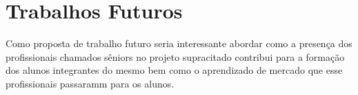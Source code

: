 \section{Trabalhos Futuros}
\label{sec:trabalhos}

Como proposta de trabalho futuro seria interessante abordar como a presença dos
profissionais chamados sêniors no projeto supracitado contribui para a formação 
dos alunos integrantes do mesmo bem como o aprendizado de mercado que esse profissionais 
passaramm para os alunos. 